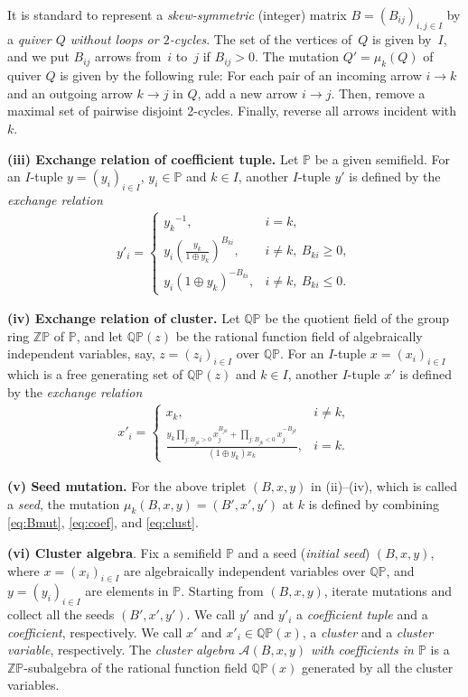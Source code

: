 It is standard to represent
a {\em skew-symmetric} (integer) matrix $B=(B_{ij})_{i,j\in I}$
by a {\em quiver $Q$
without loops or $2$-cycles}.
The set of the vertices of~$Q$ is given by~$I$,
and we put $B_{ij}$ arrows from~$i$ to~$j$
if $B_{ij}>0$.
The mutation $Q'=\mu_k(Q)$ of quiver $Q$ is given by the following
rule:
For each pair of an incoming arrow $i\rightarrow k$
and an outgoing arrow $k\rightarrow j$ in $Q$,
add a new arrow $i\rightarrow j$.
Then, remove a maximal set of pairwise disjoint 2-cycles.
Finally, reverse all arrows incident with $k$.

{\bf (iii)  Exchange relation of coef\/f\/icient tuple.}
Let $\mathbb{P}$ be a given semif\/ield.
For an $I$-tuple $y=(y_i)_{i\in I}$, $y_i\in \mathbb{P}$
and $k\in I$, another $I$-tuple $y'$ is def\/ined
by the {\em exchange relation}
\begin{gather}
\label{eq:coef}
y'_i =
\begin{cases}
\displaystyle
{y_k}{}^{-1}, &i=k,\\
\displaystyle
y_i \left(\frac{y_k}{1\oplus {y_k}}\right)^{B_{ki}},&
i\neq k,\ B_{ki}\geq 0,\\
y_i (1\oplus y_k)^{-B_{ki}},&
i\neq k,\ B_{ki}\leq 0.
\end{cases}
\end{gather}

{\bf (iv)   Exchange relation of cluster.}
Let $\mathbb{QP}$ be the  quotient f\/ield of the group ring
$\mathbb{Z}\mathbb{P}$ of $\mathbb{P}$,
 and let $\mathbb{QP}(z)$ be the rational function f\/ield of
algebraically independent variables, say, $z=(z_i)_{i\in I}$
over $\mathbb{QP}$.
For an $I$-tuple $x=(x_i)_{i\in I}$ which
is a free generating set of $\mathbb{QP}(z)$
and $k\in I$, another $I$-tuple $x'$ is def\/ined
by the {\em exchange relation}
\begin{gather}
\label{eq:clust}
x'_i =
\begin{cases}
{x_k}, &i\neq k,\\
\displaystyle
\frac{y_k
\prod\limits_{j: B_{jk}>0} x_j^{B_{jk}}
+
\prod\limits_{j: B_{jk}<0} x_j^{-B_{jk}}
}{(1\oplus y_k)x_k},
&
i= k.
\end{cases}
\end{gather}

{\bf (v)  Seed mutation.} For the above triplet $(B,x,y)$
in (ii)--(iv), which is called a {\em seed},  the mutation
$\mu_k(B,x,y)=(B',x',y')$  at $k$ is def\/ined
 by combining \eqref{eq:Bmut}, \eqref{eq:coef},
and \eqref{eq:clust}.

{\bf (vi)  Cluster algebra}. Fix a semif\/ield $\mathbb{P}$
and a seed ({\em initial seed\/}) $(B,x,y)$, where
$x=(x_i)_{i\in I}$  are algebraically independent variables
over $\mathbb{Q}\mathbb{P}$,
and
$y=(y_i)_{i\in I}$  are elements in $\mathbb{P}$.
Starting from $(B,x,y)$, iterate mutations and collect all the
seeds $(B',x',y')$.
We call  $y'$  and $y'_i$ a {\em coefficient tuple} and
a {\em coefficient}, respectively.
We call  $x'$  and $x'_i\in \mathbb{Q}\mathbb{P}(x)$, a {\em cluster} and
a {\em cluster variable}, respectively.
The {\em cluster algebra $\mathcal{A}(B,x,y)$ with
coefficients in $\mathbb{P}$} is a
$\mathbb{Z}\mathbb{P}$-subalgebra of the
rational function f\/ield $\mathbb{Q}\mathbb{P}(x)$
generated by all the cluster variables.


